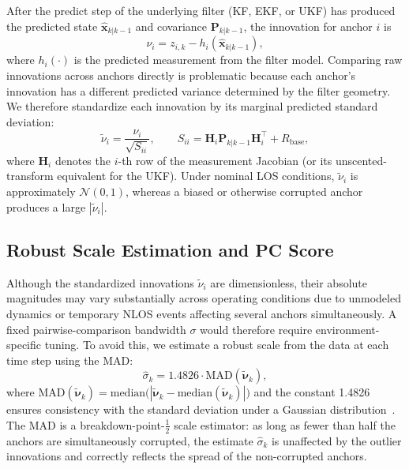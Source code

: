 \documentclass[journal]{IEEEtran}
\newcommand{\mbf}[1]{\mathbf{#1}}
\begin{document}
After the predict step of the underlying filter (KF, EKF, or UKF) has produced the predicted state $\hat{\mbf{x}}_{k|k-1}$ and covariance $\mbf{P}_{k|k-1}$, the innovation for anchor $i$ is
\begin{equation}\label{eq:innovation}
    \nu_i = z_{i,k} - h_i(\hat{\mbf{x}}_{k|k-1}),
\end{equation}
where $h_i(\cdot)$ is the predicted measurement from the filter model. Comparing raw innovations across anchors directly is problematic because each anchor's innovation has a different predicted variance determined by the filter geometry. We therefore standardize each innovation by its marginal predicted standard deviation:
\begin{equation}\label{eq:std_innov}
    \tilde{\nu}_i = \frac{\nu_i}{\sqrt{S_{ii}}}, \qquad S_{ii} = \mbf{H}_{i} \mbf{P}_{k|k-1} \mbf{H}_{i}^\top + R_{\text{base}},
\end{equation}
where $\mbf{H}_i$ denotes the $i$-th row of the measurement Jacobian (or its unscented-transform equivalent for the UKF). Under nominal LOS conditions, $\tilde{\nu}_i$ is approximately $\mathcal{N}(0,1)$, whereas a biased or otherwise corrupted anchor produces a large $|\tilde{\nu}_i|$.

\subsection{Robust Scale Estimation and PC Score}

Although the standardized innovations $\tilde{\nu}_i$ are dimensionless, their absolute magnitudes may vary substantially across operating conditions due to unmodeled dynamics or temporary NLOS events affecting several anchors simultaneously. A fixed pairwise-comparison bandwidth $\sigma$ would therefore require environment-specific tuning. To avoid this, we estimate a robust scale from the data at each time step using the MAD:
\begin{equation}\label{eq:mad_def}
    \widehat{\sigma}_k = 1.4826 \cdot \mathrm{MAD}(\tilde{\boldsymbol{\nu}}_k),
\end{equation}
where $\mathrm{MAD}(\tilde{\boldsymbol{\nu}}_k) = \mathrm{median}\bigl(|\tilde{\boldsymbol{\nu}}_k - \mathrm{median}(\tilde{\boldsymbol{\nu}}_k)|\bigr)$ and the constant 1.4826 ensures consistency with the standard deviation under a Gaussian distribution~\cite{rousseeuw_robust}. The MAD is a breakdown-point-$\tfrac{1}{2}$ scale estimator: as long as fewer than half the anchors are simultaneously corrupted, the estimate $\widehat{\sigma}_k$ is unaffected by the outlier innovations and correctly reflects the spread of the non-corrupted anchors.
\end{document}
